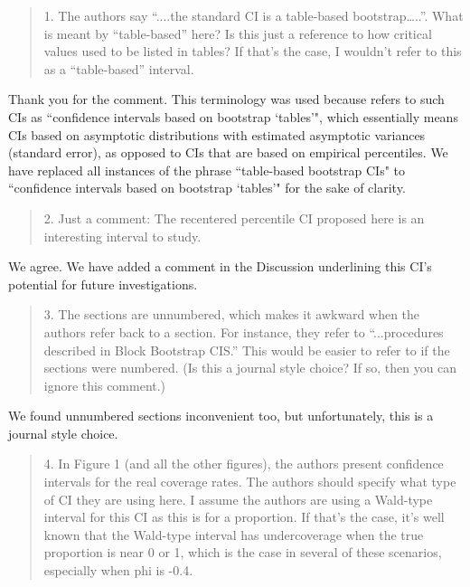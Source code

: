 \documentclass[12pt]{article}
\newenvironment{comment}%
{\begin{quotation}\noindent\small\it\color{darkblue}\ignorespaces%
}{\end{quotation}}
\begin{document}
\begin{comment}
1. The authors say “....the standard CI is a table-based bootstrap…..”.  
What is meant by “table-based” here?  Is this just a reference to how critical 
values used to be listed in tables?  If that’s the case, I wouldn’t refer to 
this as a “table-based” interval. 
\end{comment}

Thank you for the comment.  This terminology was used because 
\citet{efron1993introduction} refers to such CIs as
``confidence intervals based on 
bootstrap `tables'", which essentially means CIs based on asymptotic 
distributions with estimated asymptotic variances (standard error), as opposed
to CIs that are based on empirical percentiles.
We have replaced all instances of the phrase 
``table-based bootstrap CIs" to ``confidence intervals based on bootstrap 
`tables'" for the sake of clarity.



\begin{comment}
2. Just a comment: The recentered percentile CI proposed here is an interesting 
interval to study. 
\end{comment}

We agree. We have added a comment in the Discussion underlining this CI's
potential for future investigations.

\begin{comment}
3. The sections are unnumbered, which makes it awkward when the
authors refer back
to a section.  For instance, they refer to “...procedures described in Block 
Bootstrap CIS.”  This would be easier to refer to if the sections were numbered.  
(Is this a journal style choice?  If so, then you can ignore this comment.)
\end{comment}

We found unnumbered sections inconvenient too, but unfortunately, 
this is a journal style choice.

\begin{comment}
4.  In Figure 1 (and all the other figures), the authors present confidence 
intervals for the real coverage rates.  The authors should specify what type of 
CI they are using here.  I assume the authors are using a Wald-type interval for 
this CI as this is for a proportion.  If that’s the case, it’s well known that 
the Wald-type interval has undercoverage when the true proportion is near 0 or 
1, which is the case in several of these scenarios, especially when phi is -0.4. 
\end{comment}
\end{document}
